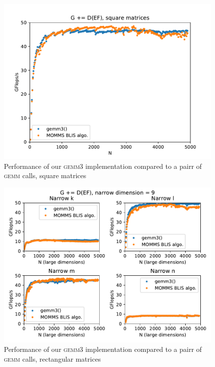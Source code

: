 \documentclass[12pt]{article}
\newcommand*{\gemmt}{{\textsc{gemm3}}}
\newcommand*{\gemm}{{\textsc{gemm}}}
\begin{document}
\begin{figure}
  \centering
  \includegraphics[height=0.40\textheight]{../results/earwig2/gemm3}
  \caption{Performance of our \gemmt{} implementation compared to a pairr of \gemm{} calls, square matrices}
  \label{fig:bc_square}
\end{figure}

\begin{figure}
  \centering
  \includegraphics[height=0.40\textheight]{../results/earwig2/gemm3_rectangles}
  \caption{Performance of our \gemmt{} implementation compared to a pairr of \gemm{} calls, rectangular matrices}
  \label{fig:bc_rectangles}
\end{figure}
\end{document}
